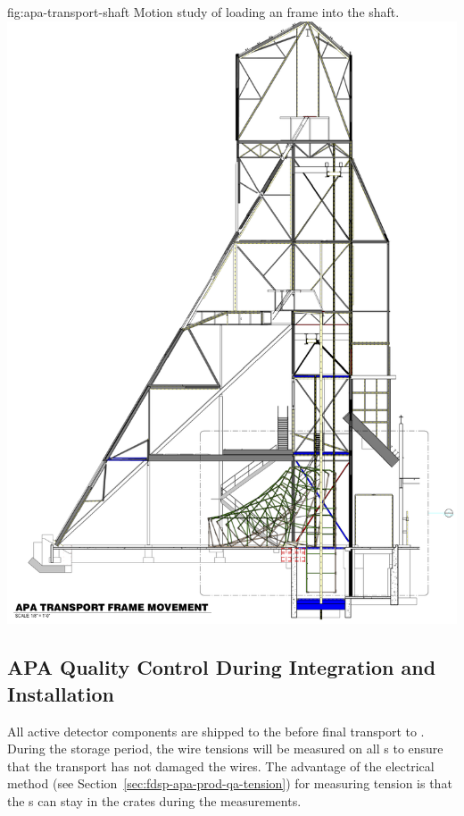 \begin{dunefigure}{fig:apa-transport-shaft}
{Motion study of loading an  frame into the shaft.}  
\includegraphics[height=0.9\textheight,trim = 0mm 0mm 0mm 0mm, clip]{graphics/sp-apa-transport-shaft.png} 
\end{dunefigure}

\subsection{APA Quality Control During Integration and Installation} %
\label{sec:fdsp-apa-transport-qc}

All active detector components are shipped to the  before final transport to . During the storage period, the wire tensions will be measured on all s to ensure that the transport has not damaged the wires.  The advantage of the electrical method (see Section~\ref{sec:fdsp-apa-prod-qa-tension}) for measuring tension is that the s can stay in the crates during the measurements. 



